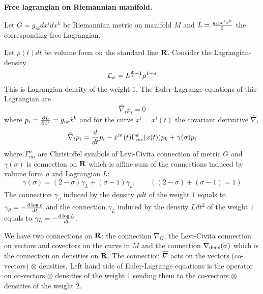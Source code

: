 \def\vare {\varepsilon}
\def\A {{\bf A}}
\def\t {\tilde}
\def\a {\alpha}
\def\K {{\bf K}}
\def\N {{\bf N}}
\def\V {{\cal V}}
\def\s {{\sigma}}
\def\S {{\Sigma}}
\def\s {{\sigma}}
\def\p{\partial}
\def\vare{{\varepsilon}}
\def\Q {{\bf Q}}
\def\D {{\cal D}}
\def\G {{\Gamma}}
\def\C {{\bf C}}
\def\M {{\cal M}}
\def\Z {{\bf Z}}
\def\U  {{\cal U}}
\def\H {{\cal H}}
\def\R  {{\bf R}}
\def\S  {{\bf S}}
\def\E  {{\bf E}}
\def\l {\lambda}
\def\degree {{\bf {\rm degree}\,\,}}
\def \finish {${\,\,\vrule height1mm depth2mm width 8pt}$}
\def \m {\medskip}
\def\p {\partial}
\def\r {{\bf r}}
\def\v {{\bf v}}
\def\n {{\bf n}}
\def\t {{\bf t}}
\def\b {{\bf b}}
\def\c {{\bf c }}
\def\e{{\bf e}}
\def\ac {{\bf a}}
\def \X   {{\bf X}}
\def \Y   {{\bf Y}}
\def \x   {{\bf x}}
\def \y   {{\bf y}}
\def \G{{\cal G}}
\def \F {{\cal F}}
\def\s {\sigma}
\def \ggb {\Gamma_{_{\bullet}}}
\def \gb {\Gamma_{_{\bullet}}}
\def \A {{\cal A}}
\def \L {{\cal L}}
           \centerline {\bf Free lagrangian on Riemannian manifold.}


Let $G=g_{ik}d x^id x^k$ be  Riemannian metric on manifold $M$ and
$L={g_{ik}\dot x^i\dot x^k\over 2}$ the corresponding free
Lagrangian.

 Let $\rho(t)dt$ be volume form on the standard line $\R$.
 Consider the Lagrangian-density
           $$
         {\cal L}_\sigma=L^{{\s\over 2}-1}\rho^{1-\sigma}
           $$
This is Lagrangian-density of the weight $1$.  The Euler-Lagrange equations of this Lagrangian
are
                $$
              \widehat\nabla_t p_i=0
                $$
where $p_i={\p L\over \p \dot x^i}=g_{ik}\dot x^k$ and for the curve $x^i=x^i(t)$ the covariant derivative $\widehat\nabla_t$
              $$
            \widehat\nabla_t p_i={d\over dt}p_i-\dot x^m(t)\Gamma_{mi}^k(x(t)) p_k+\gamma(\sigma)p_i
              $$
where $\Gamma_{mi}^k$ are Christoffel symbols of Levi-Civita connection of metric $G$ and $\gamma(\sigma)$
is connection on $\R$ which is affine sum of the connections induced by volume form $\rho$ and
Lagrangian $L$:
               $$
            \gamma(\sigma)=(2-\sigma)\gamma_L+(\sigma-1)\gamma_\rho,\qquad ((2-\sigma)+(\sigma-1)=1)
               $$
The connection $\gamma_\rho$ induced by the density $\rho dt$ of the weight $1$ equals to
$\gamma_\rho=-{d\log \rho\over dt}$
and the connection $\gamma_L$ induced by the density $L dt^2$ of the weight $1$ equals to
$\gamma_L=-{d\log L\over dt}$.

 We have two connections on $\R$: the connection $\nabla_G$, the Levi-Civita connection on vectors and covectors
 on the curve in $M$ and the connection $\nabla_{\rm dens}(\sigma)$ which is the connection on densities on $\R$.
 The connection $\widehat\nabla$ acts on the vectors (co-vectors)  $\otimes$ densities,
 Left hand side of Euler-Lagrange equations is the operator on co-vectors $\otimes$ densities of the weight $1$
 sending them to the co-vectors $\otimes$ densities of the weight $2$.




